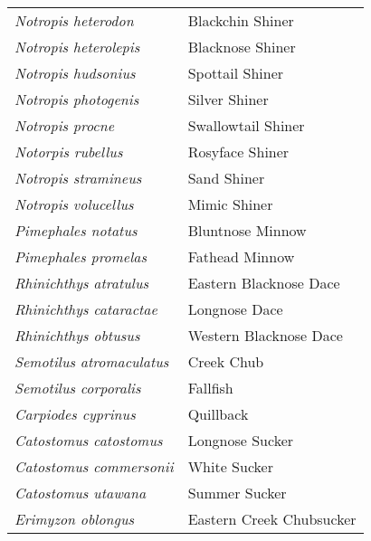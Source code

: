 \documentclass[11pt]{article}
\begin{document}
%
\textbf{\Student}

\begin{tabular}{@{}L{3in}L{3in}@{}}
\textit{Notropis heterodon} & Blackchin Shiner\tabularnewline
\textit{Notropis heterolepis} & Blacknose Shiner\tabularnewline
\textit{Notropis hudsonius} & Spottail Shiner\tabularnewline
\textit{Notropis photogenis} & Silver Shiner\tabularnewline
\textit{Notropis procne} & Swallowtail Shiner\tabularnewline
\textit{Notorpis rubellus} & Rosyface Shiner\tabularnewline
\textit{Notropis stramineus} & Sand Shiner\tabularnewline
\textit{Notropis volucellus} & Mimic Shiner\tabularnewline
\textit{Pimephales notatus} & Bluntnose Minnow\tabularnewline
\textit{Pimephales promelas} & Fathead Minnow\tabularnewline
\textit{Rhinichthys atratulus} & Eastern Blacknose Dace\tabularnewline
\textit{Rhinichthys cataractae} & Longnose Dace\tabularnewline
\textit{Rhinichthys obtusus} & Western Blacknose Dace\tabularnewline
\textit{Semotilus atromaculatus} & Creek Chub\tabularnewline
\textit{Semotilus corporalis} & Fallfish\tabularnewline
\textit{Carpiodes cyprinus} & Quillback\tabularnewline
\textit{Catostomus catostomus} & Longnose Sucker\tabularnewline
\textit{Catostomus commersonii} & White Sucker\tabularnewline
\textit{Catostomus utawana} & Summer Sucker\tabularnewline
\textit{Erimyzon oblongus} & Eastern Creek Chubsucker\tabularnewline
\end{tabular}
\end{document}
